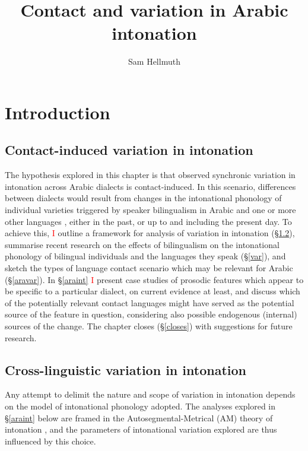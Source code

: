 \documentclass[output=paper]{langsci/langscibook}
\author{Sam Hellmuth\affiliation{University of York}}
\title{Contact and variation in Arabic intonation}
\begin{document}
\maketitle 
 
 

 \section{Introduction}


 \subsection{Contact-induced variation in intonation}


The hypothesis explored in this chapter is that observed synchronic variation in intonation across Arabic dialects is contact-induced. In this scenario, differences between dialects would result from changes in the intonational phonology of individual varieties triggered by speaker bilingualism in Arabic and one or more other languages \citep{Lucas2015}, either in the past, or up to and including the present day. To achieve this, \textcolor{red}{I} outline a framework for analysis of variation in intonation (§\ref{cross}), summarise recent research on the effects of bilingualism on the intonational phonology of bilingual individuals and the languages they speak (§\ref{var}), and sketch the types of language contact scenario which may be relevant for Arabic (§\ref{aravar}). In §\ref{araint} \textcolor{red}{I} present case studies of prosodic features which appear to be specific to a particular dialect, on current evidence at least, and discuss which of the potentially relevant contact languages might have served as the potential source of the feature in question, considering also possible endogenous (internal) sources of the change. The chapter closes (§\ref{closes}) with suggestions for future research.


 
 \subsection{Cross-linguistic variation in intonation} \label{cross}


Any attempt to delimit the nature and scope of variation in intonation depends on the model of intonational phonology adopted. The analyses explored in §\ref{araint} below are framed in the Autosegmental-Metrical (AM) theory of intonation \citep{Ladd2008}, and the parameters of intonational variation explored are thus influenced by this choice. 
\end{document}
